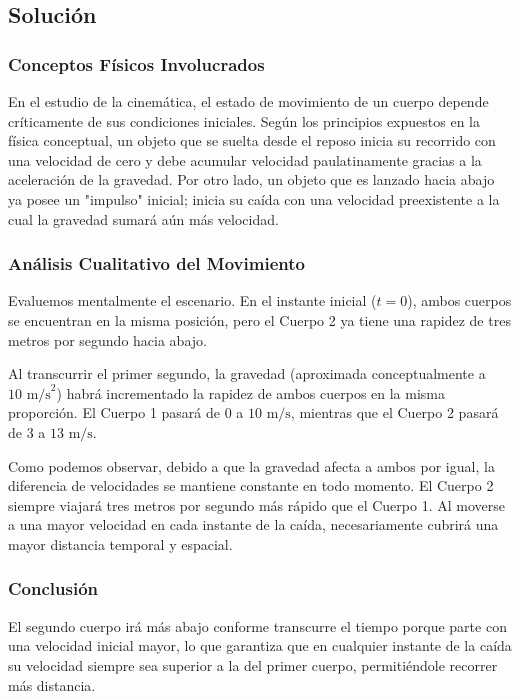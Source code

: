 \documentclass[12pt, a4paper]{article}
\begin{document}
\subsection*{Solución}

\subsubsection*{Conceptos Físicos Involucrados}

En el estudio de la cinemática, el estado de movimiento de un cuerpo depende críticamente de sus condiciones iniciales. Según los principios expuestos en la física conceptual, un objeto que se suelta desde el reposo inicia su recorrido con una velocidad de cero y debe acumular velocidad paulatinamente gracias a la aceleración de la gravedad. Por otro lado, un objeto que es lanzado hacia abajo ya posee un "impulso" inicial; inicia su caída con una velocidad preexistente a la cual la gravedad sumará aún más velocidad.

\subsubsection*{Análisis Cualitativo del Movimiento}

Evaluemos mentalmente el escenario. En el instante inicial ($t = 0$), ambos cuerpos se encuentran en la misma posición, pero el Cuerpo 2 ya tiene una rapidez de tres metros por segundo hacia abajo. 

Al transcurrir el primer segundo, la gravedad (aproximada conceptualmente a $10 \text{ m/s}^2$) habrá incrementado la rapidez de ambos cuerpos en la misma proporción. El Cuerpo 1 pasará de $0$ a $10 \text{ m/s}$, mientras que el Cuerpo 2 pasará de $3$ a $13 \text{ m/s}$. 

Como podemos observar, debido a que la gravedad afecta a ambos por igual, la diferencia de velocidades se mantiene constante en todo momento. El Cuerpo 2 siempre viajará tres metros por segundo más rápido que el Cuerpo 1. Al moverse a una mayor velocidad en cada instante de la caída, necesariamente cubrirá una mayor distancia temporal y espacial.

\subsubsection*{Conclusión}

El segundo cuerpo irá más abajo conforme transcurre el tiempo porque parte con una velocidad inicial mayor, lo que garantiza que en cualquier instante de la caída su velocidad siempre sea superior a la del primer cuerpo, permitiéndole recorrer más distancia.
\end{document}
